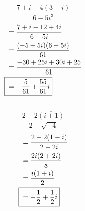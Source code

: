 	\subsection{}
		\[\frac{7 + i - 4(3 - i)}{6 - 5i^3}\]
		\begin{align*}
			&= \frac{7 + i - 12 + 4i}{6 + 5i} \\
			&= \frac{(-5 + 5i)(6 - 5i)}{61} \\
			&= \frac{-30 + 25i + 30i + 25}{61} \\
			\Aboxed{{} &= -\frac{5}{61} + \frac{55}{61}i}
		\end{align*}
		\pagebreak{}

	\subsection{}
		\[\frac{2 - 2\overline{(i + 1)}}{2 - \sqrt{-4}}\]
		\begin{align*}
			&= \frac{2 - 2(1 - i)}{2 - 2i} \\
			&= \frac{2i(2 + 2i)}{8} \\
			&= \frac{i(1 + i)}{2} \\
			\Aboxed{{} &= -\frac{1}{2} + \frac{1}{2}i}
		\end{align*}
